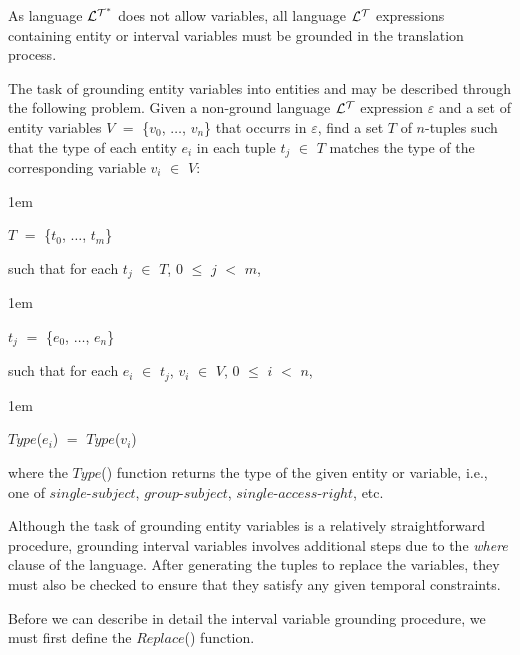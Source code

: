 \documentclass[11pt]{report}
\newenvironment{vquote}
{
  \begin{list}{}{\leftmargin 1em}\item[]
}
{
  \end{list}
}
\begin{document}
\begin{itemize}
              As language ${\cal L^{T^*}}$ does not allow variables, all
	      language ${\cal L^T}$ expressions containing entity or interval
              variables must be grounded in the translation process.
            
	      The task of grounding entity variables into entities and may be
              described through the following problem. Given a non-ground
	      language ${\cal L^T}$ expression $\varepsilon$ and a set of
              entity variables $V$ $=$ \{$v_0$, $\ldots$, $v_n$\} that occurrs
              in $\varepsilon$, find a set $T$ of $n$-tuples such that the type
              of each entity $e_i$ in each tuple $t_j$ $\in$ $T$ matches the
              type of the corresponding variable $v_i$ $\in$ $V$:

              \begin{vquote}
                $T$ $=$ \{$t_0$, $\ldots$, $t_m$\}
              \end{vquote}

              \noindent
              such that for each $t_j$ $\in$ $T$, $0$ $\leq$ $j$ $<$ $m$,

              \begin{vquote}
                $t_j$ $=$ \{$e_0$, $\ldots$, $e_n$\}
              \end{vquote}

              \noindent
              such that for each $e_i$ $\in$ $t_j$, $v_i$ $\in$ $V$,
              $0$ $\leq$ $i$ $<$ $n$,

              \begin{vquote}
                $Type$($e_i$) $=$ $Type$($v_i$)
              \end{vquote}

              \noindent
              where the $Type$() function returns the type of the given entity
              or variable, i.e., one of $single$-$subject$, $group$-$subject$,
              $single$-$access$-$right$, etc.

              Although the task of grounding entity variables is a relatively
              straightforward procedure, grounding interval variables involves
              additional steps due to the {\em where} clause of the language.
              After generating the tuples to replace the variables, they must
              also be checked to ensure that they satisfy any given temporal
              constraints.
            
              Before we can describe in detail the interval variable grounding
              procedure, we must first define the $Replace$() function.
            

\end{itemize}
\end{document}
